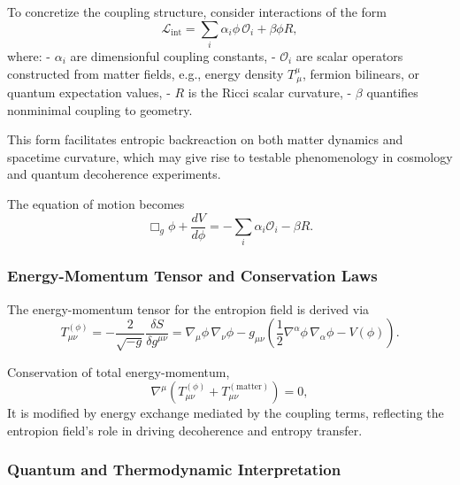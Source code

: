 \documentclass[12pt]{article}
\begin{document}
To concretize the coupling structure, consider interactions of the form
\begin{equation}
    \mathcal{L}_{\mathrm{int}} = \sum_i \alpha_i \phi \, \mathcal{O}_i + \beta \phi R,
    \label{eq:entropion_couplings}
\end{equation}
where:
- \(\alpha_i\) are dimensionful coupling constants,
- \(\mathcal{O}_i\) are scalar operators constructed from matter fields, e.g., energy density \(T^\mu_{\ \mu}\), fermion bilinears, or quantum expectation values,
- \(R\) is the Ricci scalar curvature,
- \(\beta\) quantifies nonminimal coupling to geometry.

This form facilitates entropic backreaction on both matter dynamics and spacetime curvature, which may give rise to testable phenomenology in cosmology and quantum decoherence experiments.

The equation of motion becomes
\begin{equation}
    \Box_g \phi + \frac{dV}{d\phi} = - \sum_i \alpha_i \mathcal{O}_i - \beta R.
    \label{eq:entropion_eom_explicit}
\end{equation}

\subsubsection*{Energy-Momentum Tensor and Conservation Laws}

The energy-momentum tensor for the entropion field is derived via
\begin{equation}
    T_{\mu\nu}^{(\phi)} = -\frac{2}{\sqrt{-g}} \frac{\delta S}{\delta g^{\mu\nu}} = \nabla_\mu \phi \, \nabla_\nu \phi - g_{\mu\nu} \left( \frac{1}{2} \nabla^\alpha \phi \, \nabla_\alpha \phi - V(\phi) \right).
    \label{eq:entropion_energy_momentum}
\end{equation}

Conservation of total energy-momentum,
\begin{equation}
\nabla^\mu \left(T_{\mu\nu}^{(\phi)} + T_{\mu\nu}^{(\mathrm{matter})}\right) = 0,
\end{equation}
It is modified by energy exchange mediated by the coupling terms, reflecting the entropion field’s role in driving decoherence and entropy transfer.

\subsubsection*{Quantum and Thermodynamic Interpretation}
\end{document}
